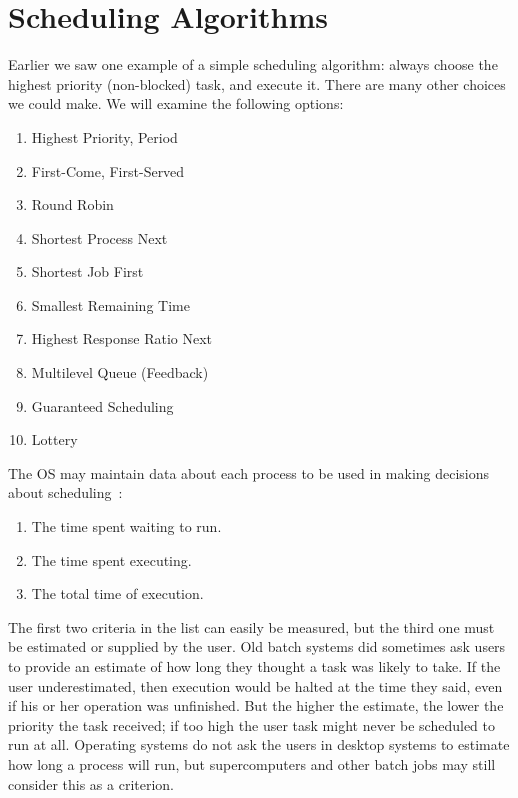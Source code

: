 




\section*{Scheduling Algorithms}

Earlier we saw one example of a simple scheduling algorithm: always choose the highest priority (non-blocked) task, and execute it. There are many other choices we could make. We will examine the following options:
\begin{enumerate}
	\item Highest Priority, Period
	\item First-Come, First-Served
	\item Round Robin
	\item Shortest Process Next
	\item Shortest Job First
	\item Smallest Remaining Time
	\item Highest Response Ratio Next
	\item Multilevel Queue (Feedback)
	\item Guaranteed Scheduling
	\item Lottery
\end{enumerate}

The OS may maintain data about each process to be used in making decisions about scheduling~\cite{osi}:

\begin{enumerate}
	\item The time spent waiting to run.
	\item The time spent executing.
	\item The total time of execution.
\end{enumerate}

The first two criteria in the list can easily be measured, but the third one must be estimated or supplied by the user. Old batch systems did sometimes ask users to provide an estimate of how long they thought a task was likely to take. If the user underestimated, then execution would be halted at the time they said, even if his or her operation was unfinished. But the higher the estimate, the lower the priority the task received; if too high the user task might never be scheduled to run at all. Operating systems do not ask the users in desktop systems to estimate how long a process will run, but supercomputers and other batch jobs may still consider this as a criterion.

